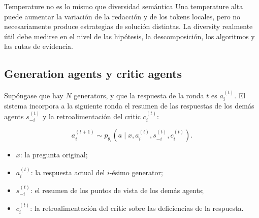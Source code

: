 \documentclass[a4paper]{article}
\begin{document}
\begin{warningbox}{Temperature no es lo mismo que diversidad semántica}
Una temperature alta puede aumentar la variación de la redacción y de los tokens locales, pero no necesariamente produce estrategias de solución distintas. La diversity realmente útil debe medirse en el nivel de las hipótesis, la descomposición, los algoritmos y las rutas de evidencia.
\end{warningbox}

\subsection{Generation agents y critic agents}




Supóngase que hay $N$ generators, y que la respuesta de la ronda $t$ es $a_i^{(t)}$. El sistema incorpora a la siguiente ronda el resumen de las respuestas de los demás agents $s_{-i}^{(t)}$ y la retroalimentación del critic $c_i^{(t)}$:

$$
a_i^{(t+1)}\sim p_{\theta_i}
\left(a\mid x,a_i^{(t)},s_{-i}^{(t)},c_i^{(t)}\right).
$$

\begin{itemize}
    \item $x$: la pregunta original;
    \item $a_i^{(t)}$: la respuesta actual del $i$-ésimo generator;
    \item $s_{-i}^{(t)}$: el resumen de los puntos de vista de los demás agents;
    \item $c_i^{(t)}$: la retroalimentación del critic sobre las deficiencias de la respuesta.
\end{itemize}

\end{document}

